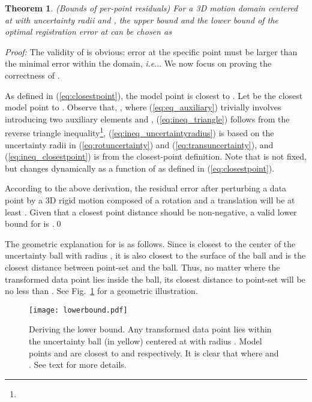 \documentclass[10pt,journal,cspaper,compsoc]{IEEEtran}
\makeatletter
\DeclareRobustCommand\onedot{\futurelet\@let@token\@onedot}
\def\@onedot{\ifx\@let@token.\else.\null\fi\xspace}
\def\ie{\emph{i.e}\onedot} \def\Ie{\emph{I.e}\onedot}
\newtheorem{theorem}{Theorem}
\makeatother
\begin{document}
\begin{theorem}(Bounds of per-point residuals) For a 3D motion domain  centered at  with uncertainty radii  and , the upper bound  and the lower bound  of the optimal registration error  at  can be chosen as

\end{theorem}

\noindent\emph{Proof:}
The validity of  is obvious: error  at the specific point  must be larger than the minimal error within the domain, \ie . We now focus on proving the correctness of .

As defined in (\ref{eq:closestpoint}), the model point  is closest to .  Let  be the closest model point to .  Observe that, ,
 where (\ref{eq:eq_auxiliary}) trivially involves introducing two auxiliary elements  and , (\ref{eq:ineq_triangle}) follows from the reverse triangle inequality\footnote{}, (\ref{eq:ineq_uncertaintyradius}) is based on the uncertainty radii in (\ref{eq:rotuncertainty}) and (\ref{eq:transuncertainty}), and (\ref{eq:ineq_closestpoint}) is from the closest-point definition.  Note that  is not fixed, but changes dynamically as a function of  as defined in (\ref{eq:closestpoint}).

According to the above derivation, the residual error  after perturbing a data point  by a 3D rigid motion composed of a rotation  and a translation  will be at least . Given that a closest point distance should be non-negative, a valid lower bound  for  is .\qed
\vspace{3pt}


The geometric explanation for  is as follows. Since  is closest to the center  of the uncertainty ball with radius , it is also closest to the surface of the ball and  is the closest distance between point-set  and the ball. Thus, no matter where the transformed data point  lies inside the ball, its closest distance to point-set  will be no less than . See Fig.~\ref{fig:lowerbound} for a geometric illustration.

\begin{figure}
\begin{center}
\texttt{[image: lowerbound.pdf]}
\vspace{0pt}
\caption{Deriving the lower bound. Any transformed data point  lies within the uncertainty ball (in yellow) centered at  with radius . Model points  and  are closest to  and  respectively. It is clear that  where  and . See text for more details.
\label{fig:lowerbound}}
\end{center}
\vspace{0pt}
\end{figure}
\end{document}
